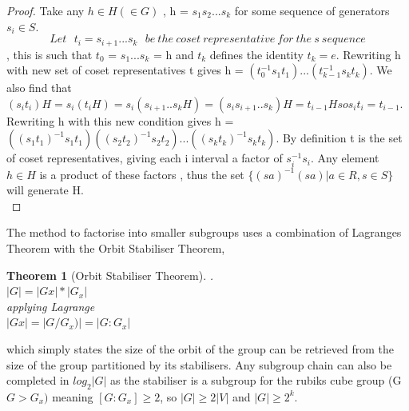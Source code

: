 \documentclass{article}
\newtheorem{theorem}{Theorem}[section]
\begin{document}
\begin{proof}
Take any $h\in H (\in G)$ , h = $s_{1}s_{2}...s_{k}$ for some sequence of generators $s_{i} \in S$.
\[Let\ \ \ t_{i} = s_{i+1}...s_{k}\ \ \ be\ the\ coset\ representative\ for\ the\ s\ sequence\] , this is such that $t_{0}$ = $s_{1}...s_{k}$ = h and $t_{k}$ defines the identity $t_{k} = e$.
Rewriting h with new set of coset representatives t gives h = $(t_{0}^{-1} s_{1} t_{1}) ...(t_{k-1}^{-1} s_{k} t_{k})$.
We also find that $(s_{i} t_{i})H = s_{i}(t_{i} H) = s_{i} ( s_{i+1}..s_{k} H) = (s_{i}s_{i+1}..s_{k})H = t_{i-1} H so s_{i} t_{i} = t_{i-1}.$
Rewriting h with this new condition gives h = $((s_{1} t_{1})^{-1} s_{1} t_{1})((s_{2} t_{2})^{-1} s_{2} t_{2}) ...((s_{k} t_{k})^{-1} s_{k} t_{k})$.
By definition t is the set of coset representatives, giving each i interval a factor of $s_{i}^{-1}s_{i}$. Any element $h \in H$ is a product of these factors , thus the set $\{(sa)^{-1} (sa) | a \in R, s \in S \}$ will generate H.\\
\end{proof}
The method to factorise into smaller subgroups uses a combination of Lagranges Theorem with the Orbit Stabiliser Theorem, 
\begin{theorem}[Orbit Stabiliser Theorem]
.\\
$|G|= |Gx|*|G_{x}|$\\
applying Lagrange\\
$|Gx|=|G/G_{x})|=|G:G_{x}|$
\end{theorem}
which simply states the size of the orbit of the group can be retrieved from the size of the group partitioned by its stabilisers. Any subgroup chain can also be completed in $log_{2}|G|$ as the stabiliser is a subgroup for the rubiks cube group (G $G>G_{x})$ meaning $[G:G_{x}]\geq 2$, so $|G|\geq2|V|$ and $|G|\geq 2^{k}.$
\end{document}
